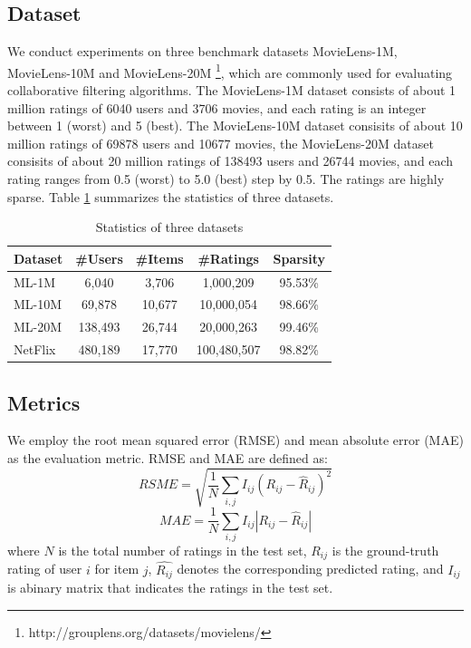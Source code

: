 \documentclass{sig-alternate-05-2015}
\begin{document}
\subsection{Dataset}
We conduct experiments on three benchmark datasets MovieLens-1M, MovieLens-10M and MovieLens-20M
\footnote{http://grouplens.org/datasets/movielens/},
which are commonly used for evaluating collaborative filtering algorithms.
The MovieLens-1M dataset consists of about 1 million ratings of 6040 users and 3706 movies,
and each rating is an integer between 1 (worst) and 5 (best).
The MovieLens-10M dataset consisits of about 10 million ratings of 69878 users and 10677 movies,
the MovieLens-20M dataset consisits of about 20 million ratings of 138493 users and 26744 movies,
and each rating ranges from 0.5 (worst) to 5.0 (best) step by 0.5.
The ratings are highly sparse.
Table \ref{tab:statistics} summarizes the statistics of three datasets.

\begin{table}[htpb]
	\centering
	\caption{Statistics of three datasets}
	\label{tab:statistics}
	\begin{tabular}{|l|c|c|c|c|}
		\hline
		\textbf{Dataset} & \textbf{\#Users} & \textbf{\#Items} & \textbf{\#Ratings} & \textbf{Sparsity} \\
		\hline
		ML-1M  & 6,040    & 3,706  & 1,000,209   & 95.53\% \\
		ML-10M & 69,878   & 10,677 & 10,000,054  & 98.66\% \\
		ML-20M & 138,493  & 26,744 & 20,000,263  & 99.46\% \\
		NetFlix & 480,189 & 17,770 & 100,480,507 & 98.82\% \\
		\hline
	\end{tabular}
\end{table}

\subsection{Metrics}
We employ the root mean squared error (RMSE) and mean absolute error (MAE) as the evaluation metric.
RMSE and MAE are defined as:
\begin{equation}
	RSME = \sqrt{ \frac{1}{N} \sum_{i,j} I_{ij} (R_{ij} - \hat{R}_{ij})^2 }
\end{equation}
\begin{equation}
	MAE = \frac{1}{N} \sum_{i,j} I_{ij} |R_{ij} - \hat{R}_{ij}|
\end{equation}
where $N$ is the total number of ratings in the test set,
$R_{ij}$ is the ground-truth rating of user $i$ for item $j$,
$\hat{R_{ij}}$ denotes the corresponding predicted rating,
and $I_{ij}$ is abinary matrix that indicates the ratings in the test set.
\end{document}
